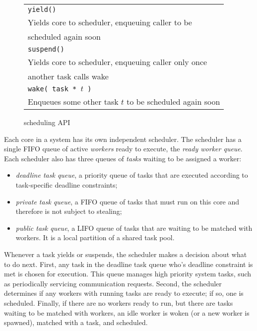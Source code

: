 \begin{figure}[htbp]
  \begin{center}
	\begin{tabular}{l}
    \texttt{\scriptsize yield() } \\
      Yields core to scheduler, enqueuing caller to be \\ scheduled again soon \\
    \texttt{\scriptsize suspend() }  \\
      Yields core to scheduler, enqueuing caller only once \\ another task calls wake \\
    \texttt{\scriptsize wake( task * $t$ ) } \\
      Enqueues some other task $t$ to be scheduled again soon \\
	\end{tabular}
    \begin{minipage}{0.95\columnwidth}
      \caption{\label{fig:scheduling} \Grappa scheduling API } 
    \end{minipage}
  \end{center}
\end{figure}

Each core in a \Grappa system has its own independent scheduler. The scheduler
has a single FIFO queue of active \emph{workers} ready to execute, the {\it
ready worker queue}. Each scheduler also has three queues of \emph{tasks}
waiting to be assigned a worker:

\begin{itemize}

\item {\it deadline task queue}, a priority queue of tasks that are executed according to task-specific deadline constraints;

\item {\it private task queue}, a FIFO queue of tasks that must run on
this core and therefore is not subject to stealing;

\item {\it public task queue},  a LIFO queue of tasks that are
  waiting to be matched with workers. It is a local partition of a shared
  task pool.

\end{itemize}


Whenever a task yields or suspends, the scheduler makes a decision about what
to do next. First, any task in the deadline task queue who's deadline
constraint is met is chosen for execution. This queue manages high priority
system tasks, such as periodically servicing communication requests. Second,
the scheduler determines if any workers with running tasks are ready to
execute; if so, one is scheduled. Finally, if there are no workers ready to
run, but there are tasks waiting to be matched with workers, an idle worker is
woken (or a new worker is spawned), matched with a task, and scheduled.

